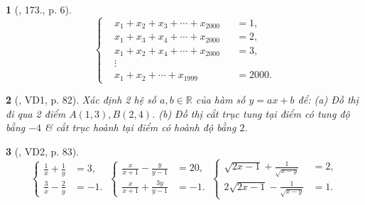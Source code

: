 \documentclass{article}
\newtheorem{baitoan}{}
\begin{document}
\begin{baitoan}[\cite{Dong_23_1001_toan_I}, 173., p. 6]
	\begin{equation*}
		\left\{\begin{split}
			&x_1 + x_2 + x_3 + \cdots + x_{2000} &&= 1,\\
			&x_1 + x_3 + x_4 + \cdots + x_{2000} &&= 2,\\
			&x_1 + x_2 + x_4 + \cdots + x_{2000} &&= 3,\\
			&\vdots\\
			&x_1 + x_2 + \cdots + x_{1999} &&= 2000.
		\end{split}\right.
	\end{equation*}
\end{baitoan}

\begin{baitoan}[\cite{Kien_dai_so_9}, VD1, p. 82]
	Xác định 2 hệ số $a,b\in\mathbb{R}$ của hàm số $y = ax + b$ để: (a) Đồ thị đi qua 2 điểm $A(1,3),B(2,4)$. (b) Đồ thị cắt trục tung tại điểm có tung độ bằng $-4$ \& cắt trục hoành tại điểm có hoành độ bằng $2$.
\end{baitoan}

\begin{baitoan}[\cite{Kien_dai_so_9}, VD2, p. 83]
	\begin{equation*}
		\left\{\begin{split}
			\frac{1}{x} + \frac{1}{y} &= 3,\\
			\frac{3}{x} - \frac{2}{y} &= -1.
		\end{split}\right.\ \left\{\begin{split}
			\frac{x}{x + 1} - \frac{y}{y - 1} &= 20,\\
			\frac{x}{x + 1} + \frac{3y}{y - 1} &= -1.
		\end{split}\right.\ \left\{\begin{split}
			\sqrt{2x - 1} + \frac{1}{\sqrt{x - y}} &= 2,\\
			2\sqrt{2x - 1} - \frac{1}{\sqrt{x - y}} &= 1.
		\end{split}\right.
	\end{equation*}
\end{baitoan}
\end{document}
